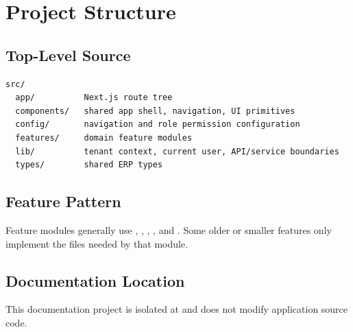 \chapter{Project Structure}
\section{Top-Level Source}
\begin{lstlisting}
src/
  app/          Next.js route tree
  components/   shared app shell, navigation, UI primitives
  config/       navigation and role permission configuration
  features/     domain feature modules
  lib/          tenant context, current user, API/service boundaries
  types/        shared ERP types
\end{lstlisting}

\section{Feature Pattern}
Feature modules generally use , , , , and . Some older or smaller features only implement the files needed by that module.

\section{Documentation Location}
This documentation project is isolated at  and does not modify application source code.
